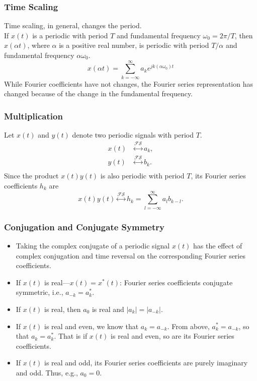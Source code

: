 \begin{frame}[plain]\frametitle{Time Scaling}
    {
        Time scaling, in general, changes the period.\\
        If $x(t)$ is a periodic with period $T$ and fundamental frequency $\omega_0 = 2\pi/T$, then $x(\alpha t)$, where $\alpha$ is a positive real number, is periodic with period $T/\alpha$ and fundamental frequency $\alpha \omega_0$.
        \begin{equation}
            x(\alpha t) = \sum_{k=-\infty}^{\infty} a_k e^{jk(\alpha \omega_0)t}
        \end{equation}
        While Fourier coefficients have not changes, the Fourier series representation \alert{has} changed because of the change in the fundamental frequency.

    }
\end{frame}


\begin{frame}[plain]\frametitle{Multiplication}
    {
        Let $x(t)$ and $y(t)$ denote two periodic signals with period $T$.
        \begin{align*}
            x(t) &\overset{\mathcal{FS}}{\longleftrightarrow} a_k,\\
            y(t) &\overset{\mathcal{FS}}{\longleftrightarrow} b_k.\\
        \end{align*}
        Since the product $x(t)y(t)$ is also periodic with period $T$, its Fourier series coefficients $h_k$ are
        \begin{equation}
            x(t)y(t) \overset{\mathcal{FS}}{\longleftrightarrow} h_k = \sum_{l=-\infty}^{\infty}a_l b_{k-l}.
        \end{equation}

    }
\end{frame}


\begin{frame}[plain]\frametitle{Conjugation and Conjugate Symmetry}
    {

        \begin{itemize}[<+->]
          \item Taking the complex conjugate of a periodic signal $x(t)$ has the effect of complex conjugation and \alert{time reversal} on the corresponding Fourier series coefficients.
          \item If $x(t)$ is real---$x(t) = x^\ast(t)$: Fourier series coefficients conjugate symmetric, i.e., $a_{-k} = a^\ast_k$.
          \item If $x(t)$ is real, then $a_0$ is real and $|a_k| = |a_{-k}|$.
          \item If $x(t)$ is real and even, we know that $a_k = a_{-k}$. From above, $a^\ast_k = a_{-k}$, so that $a_{k} = a^\ast_k$. That is if $x(t)$ is real and even, so are its Fourier series coefficients.
          \item If $x(t)$ is real and odd, its Fourier series coefficients are purely imaginary and odd. Thus, e.g., $a_0 = 0$.%
        \end{itemize}
    }
\end{frame}



